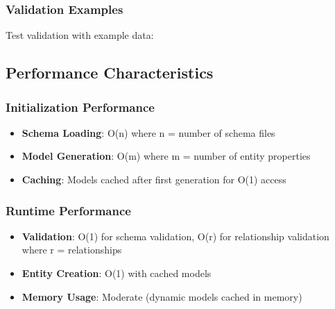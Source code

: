 \subsubsection{Validation Examples}
\label{sec:python-validation-examples}

Test validation with example data:

\begin{pythonexample}{Validation Examples}
\begin{verbatim}
# Load and validate example data
with open('examples/validation/comprehensive_validation_test_suite.json') as f:
    test_data = json.load(f)

validator = DynamicBOOSTValidator()
results = validator.comprehensive_validation(test_data)

print(f"Validation results: {results['summary']}")
for category, result in results['by_category'].items():
    print(f"  {category}: {'PASS' if result['valid'] else 'FAIL'}")
\end{verbatim}}
\end{pythonexample}

\subsection{Performance Characteristics}
\label{sec:python-performance}

\subsubsection{Initialization Performance}
\label{sec:python-init-performance}

\begin{itemize}
    \item \textbf{Schema Loading}: O(n) where n = number of schema files
    \item \textbf{Model Generation}: O(m) where m = number of entity properties  
    \item \textbf{Caching}: Models cached after first generation for O(1) access
\end{itemize}

\subsubsection{Runtime Performance}
\label{sec:python-runtime-performance}

\begin{itemize}
    \item \textbf{Validation}: O(1) for schema validation, O(r) for relationship validation where r = relationships
    \item \textbf{Entity Creation}: O(1) with cached models
    \item \textbf{Memory Usage}: Moderate (dynamic models cached in memory)
\end{itemize}

